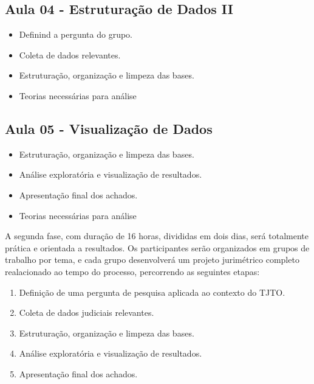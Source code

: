 \documentclass[
  letterpaper,
  DIV=11,
  numbers=noendperiod]{scrreprt}
\providecommand{\tightlist}{%
  \setlength{\itemsep}{0pt}\setlength{\parskip}{0pt}}
\begin{document}
\subsection{Aula 04 - Estruturação de Dados
II}\label{aula-04---estruturauxe7uxe3o-de-dados-ii}

\begin{itemize}
\tightlist
\item
  Definind a pergunta do grupo.\\
\item
  Coleta de dados relevantes.\\
\item
  Estruturação, organização e limpeza das bases.
\item
  Teorias necessárias para análise
\end{itemize}

\subsection{Aula 05 - Visualização de
Dados}\label{aula-05---visualizauxe7uxe3o-de-dados}

\begin{itemize}
\tightlist
\item
  Estruturação, organização e limpeza das bases.\\
\item
  Análise exploratória e visualização de resultados.\\
\item
  Apresentação final dos achados.
\item
  Teorias necessárias para análise
\end{itemize}

A segunda fase, com duração de 16 horas, divididas em dois dias, será
totalmente prática e orientada a resultados. Os participantes serão
organizados em grupos de trabalho por tema, e cada grupo desenvolverá um
projeto jurimétrico completo realacionado ao tempo do processo,
percorrendo as seguintes etapas:

\begin{enumerate}
\def\labelenumi{\arabic{enumi}.}
\tightlist
\item
  Definição de uma pergunta de pesquisa aplicada ao contexto do TJTO.\\
\item
  Coleta de dados judiciais relevantes.\\
\item
  Estruturação, organização e limpeza das bases.\\
\item
  Análise exploratória e visualização de resultados.\\
\item
  Apresentação final dos achados.
\end{enumerate}
\end{document}
